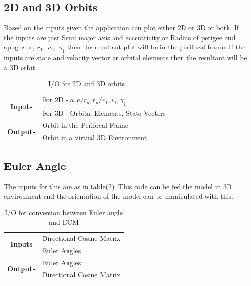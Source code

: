 \subsection{2D and 3D Orbits}

Based on the inputs given the application can plot either 2D or 3D or both. If the inputs are just Semi major axis and eccentricity or Radius of perigee and apogee or, $r_1,\;v_1,\;\gamma_1$ then the resultant plot will be in the perifocal frame. If the inputs are state and velocity vector or orbital elements then the resultant will be a 3D orbit. 
\begin{table}[H]
\centering
\begin{tabular}{@{}cl@{}}
\toprule
\multirow{2}{*}{\textbf{Inputs}}                      & For 2D - $a,e/r_a,r_p/ r_1, v_1, \gamma_1$ \\ \cmidrule(l){2-2} 
                                             & For 3D - Orbital Elements, State Vectors   \\ \midrule
\multicolumn{1}{r}{\multirow{2}{*}{\textbf{Outputs}}} & Orbit in the Perifocal Frame               \\ \cmidrule(l){2-2} 
\multicolumn{1}{r}{}                         & Orbit in a virtual 3D Environment          \\ \bottomrule
\end{tabular}
\caption{I/O for 2D and 3D orbits}
\label{o23}
\end{table}
\subsection{Euler Angle}

The inputs for this are as in table(\ref{eadcm}). This code can be fed the model in 3D environment and the orientation of the model can be manipulated with this.
\begin{table}[H]
\centering
\begin{tabular}{@{}cl@{}}
\toprule
\multirow{2}{*}{\textbf{Inputs}}                      & Directional Cosine Matrix \\ \cmidrule(l){2-2} 
                                             & Euler Angles              \\ \midrule
\multicolumn{1}{r}{\multirow{2}{*}{\textbf{Outputs}}} & Euler Angles              \\ \cmidrule(l){2-2} 
\multicolumn{1}{r}{}                         & Directional Cosine Matrix \\ \bottomrule
\end{tabular}
\caption{I/O for conversion between Euler angle and DCM}
\label{eadcm}
\end{table}
